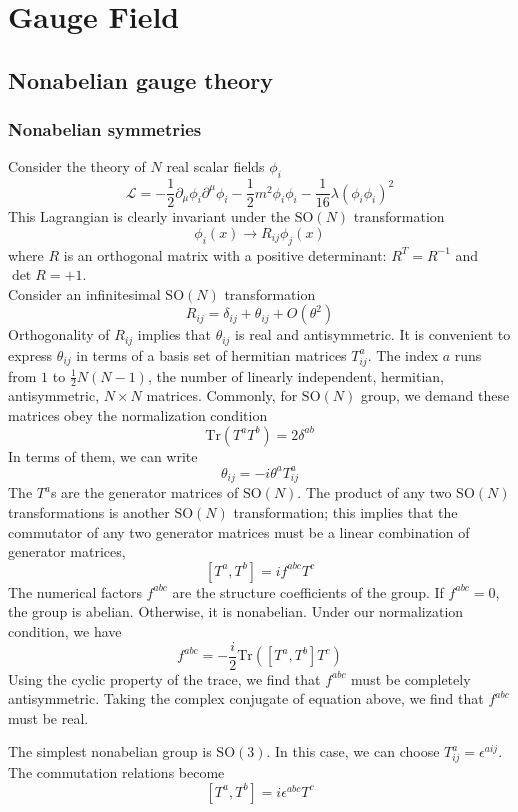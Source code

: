 \chapter{Gauge Field}
\section{Nonabelian gauge theory}
\subsection{Nonabelian symmetries}
Consider the theory of $N$ real scalar fields $\phi_i$
\[\mathcal{L} = -\frac{1}{2}\partial_{\mu}\phi_i \partial^{\mu}\phi_i - \frac{1}{2}m^2\phi_i\phi_i - \frac{1}{16}\lambda(\phi_i\phi_i)^2\]
This Lagrangian is clearly invariant under the $\mathrm{SO}(N)$ transformation
\[\phi_i(x) \to R_{ij}\phi_j(x)\]
where $R$ is an orthogonal matrix with a positive determinant: $R^T = R^{-1}$ and $\det R = +1$.
\\
Consider an infinitesimal $\mathrm{SO}(N)$ transformation
\[R_{ij} = \delta_{ij} + \theta_{ij} + O(\theta^2)\]
Orthogonality of $R_{ij}$ implies that $\theta_{ij}$ is real and antisymmetric. It is convenient to express $\theta_{ij}$ in terms of a basis set of hermitian matrices $T^a_{ij}$. The index $a$ runs from $1$ to $\frac{1}{2}N(N-1)$, the number of linearly independent, hermitian, antisymmetric, $N \times N$ matrices. Commonly, for $\mathrm{SO}(N)$ group, we demand these matrices obey the normalization condition
\[\mathrm{Tr}(T^a T^b) = 2\delta^{ab}\]
In terms of them, we can write
\[\theta_{ij} = -i\theta^a T^a_{ij}\]
The $T^a$s are the generator matrices of $\mathrm{SO}(N)$. The product of any two $\mathrm{SO}(N)$ transformations is another $\mathrm{SO}(N)$ transformation; this implies that the commutator of any two generator matrices must be a linear combination of generator matrices,
\[[T^a,T^b] = if^{abc}T^c\]
The numerical factors $f^{abc}$ are the structure coefficients of the group. If $f^{abc} = 0$, the group is abelian. Otherwise, it is nonabelian. Under our normalization condition, we have
\[f^{abc} = -\frac{i}{2} \mathrm{Tr} \left([T^a,T^b]T^c \right)\]
Using the cyclic property of the trace, we find that $f^{abc}$ must be completely antisymmetric. Taking the complex conjugate of equation above, we find that $f^{abc}$ must be real.

\begin{example}
The simplest nonabelian group is $\mathrm{SO}(3)$. In this case, we can choose $T^a_{ij} = \epsilon^{aij}$. The commutation relations become
\[[T^a,T^b] = i\epsilon^{abc}T^c\]
\end{example}

